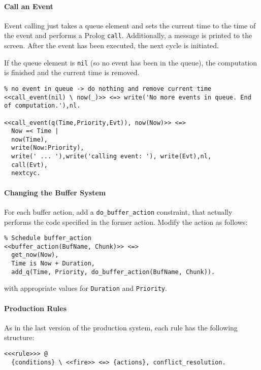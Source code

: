 \paragraph{Call an Event} 

Event calling just takes a queue element and sets the current time to the time of the event and performs a Prolog \lstinline|call|. Additionally, a message is printed to the screen. After the event has been executed, the next cycle is initiated.

If the queue element is \lstinline|nil| (so no event has been in the queue), the computation is finished and the current time is removed.

\begin{lstlisting}
% no event in queue -> do nothing and remove current time
<<call_event(nil) \ now(_)>> <=> write('No more events in queue. End of computation.'),nl.

<<call_event(q(Time,Priority,Evt)), now(Now)>> <=> 
  Now =< Time | 
  now(Time),
  write(Now:Priority),
  write(' ... '),write('calling event: '), write(Evt),nl,
  call(Evt),
  nextcyc.
\end{lstlisting}

\paragraph{Changing the Buffer System}
\label{changing_the_buffer_system}

For each buffer action, add a \lstinline|do_buffer_action| constraint, that actually performs the code specified in the former action. Modify the action as follows:

\begin{lstlisting}
% Schedule buffer_action
<<buffer_action(BufName, Chunk)>> <=> 
  get_now(Now),
  Time is Now + Duration, 
  add_q(Time, Priority, do_buffer_action(BufName, Chunk)). 
\end{lstlisting}

with appropriate values for \lstinline|Duration| and \lstinline|Priority|.

\paragraph{Production Rules}

As in the last version of the production system, each rule has the following structure:

\begin{lstlisting}
<<<rule>>> @
  {conditions} \ <<fire>> <=> {actions}, conflict_resolution.
\end{lstlisting}

